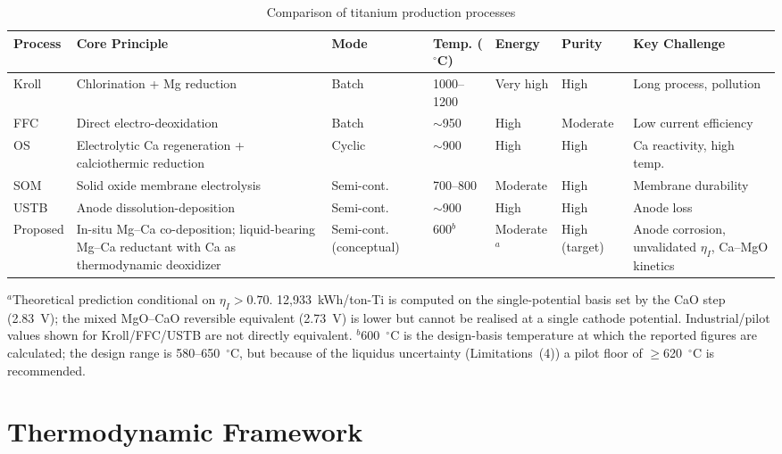 \documentclass[pdflatex,sn-basic,Numbered]{sn-jnl}
\begin{document}
\begin{table}[!ht]
  \centering
  \caption{Comparison of titanium production processes}
  \label{tab:compare}
  \footnotesize
  \setlength{\tabcolsep}{3pt}
  \begin{tabularx}{\linewidth}{@{} p{1.5cm} p{2.5cm} p{1.4cm} p{1.2cm} p{1.4cm} p{1.3cm} X @{}}
  \toprule
  Process & Core Principle & Mode & Temp. ($^{\circ}$C) & Energy & Purity & Key Challenge \\
  \midrule
  Kroll & Chlorination + Mg reduction & Batch & 1000--1200 & Very high & High & Long process, pollution \\
  FFC & Direct electro-deoxidation & Batch & $\sim$950 & High & Moderate & Low current efficiency \\
  OS & Electrolytic Ca regeneration + calciothermic reduction & Cyclic & $\sim$900 & High & High & Ca reactivity, high temp. \\
  SOM & Solid oxide membrane electrolysis & Semi-cont. & 700--800 & Moderate & High & Membrane durability \\
  USTB & Anode dissolution-deposition & Semi-cont. & $\sim$900 & High & High & Anode loss \\
  Proposed & In-situ Mg--Ca co-deposition; liquid-bearing Mg--Ca reductant with Ca as thermodynamic deoxidizer & Semi-cont. (conceptual) & 600$^{b}$ & Moderate$^{a}$ & High (target) & Anode corrosion, unvalidated $\eta_I$, Ca--MgO kinetics \\
  \bottomrule
  \end{tabularx}
  \par\vspace{2pt}
  \footnotesize $^{a}$Theoretical prediction conditional on $\eta_I > 0.70$. 12{,}933~kWh/ton-Ti is computed on the single-potential basis set by the CaO step (2.83~V); the mixed MgO--CaO reversible equivalent (2.73~V) is lower but cannot be realised at a single cathode potential. Industrial/pilot values shown for Kroll/FFC/USTB are not directly equivalent.
  $^{b}$600~$^{\circ}$C is the design-basis temperature at which the reported figures are calculated; the design range is 580--650~$^{\circ}$C, but because of the liquidus uncertainty (Limitations~(4)) a pilot floor of $\geq$620~$^{\circ}$C is recommended.
\end{table}

\section{Thermodynamic Framework}\label{sec:thermo}
\end{document}
